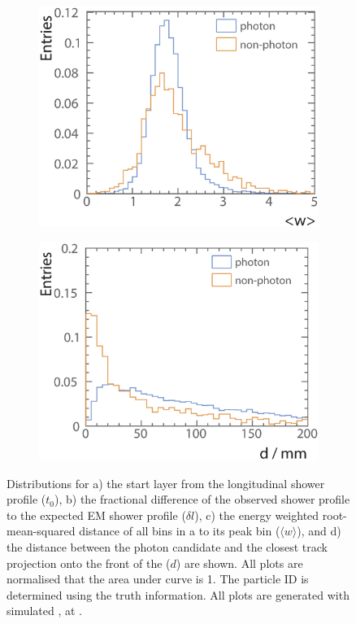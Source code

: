 \begin{figure}[tbph]
\begin{subfigure}[b]{0.45\textwidth}
    \includegraphics[width=\textwidth]{photon/likelihood/PeakRms2}
    \caption{}
    \label{fig:photonPeakRms}
  \end{subfigure}
  \begin{subfigure}[b]{0.45\textwidth}
    \includegraphics[width=\textwidth]{photon/likelihood/MinDistanceToTrack2}
    \caption{}
    \label{fig:photonMinDistanceToTrack}
  \end{subfigure}
\caption
{Distributions for a) the start layer from the longitudinal shower profile ($t_0$), b)  the fractional difference of the observed shower profile to the expected EM shower profile ($\delta{l}$), c) the energy weighted root-mean-squared distance of all bins in a \ShowerPeak to its peak bin ($\langle{w}\rangle$), and d) the distance between the photon candidate and the closest track projection onto the front of the \ECAL ($d$) are shown. All plots are normalised that the area under curve is 1. The particle ID is determined using the truth information. All plots are generated with  simulated \eeZuds, at .}
\label{fig:photonVarLikelihood}
\end{figure}



